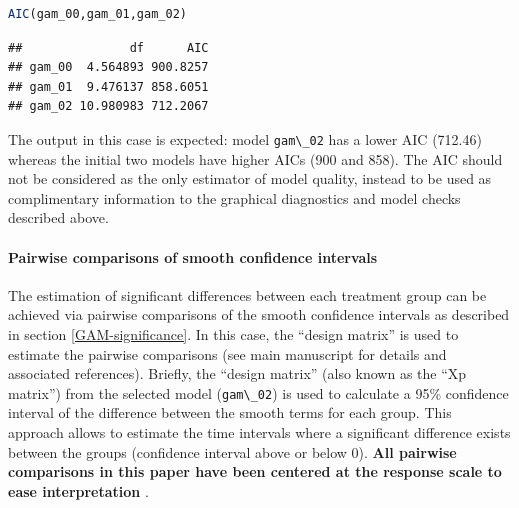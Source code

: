 \documentclass[
]{article}
\newcommand{\passthrough}[1]{#1}
\begin{document}
\begin{lstlisting}[language=R]
AIC(gam_00,gam_01,gam_02)
\end{lstlisting}

\begin{lstlisting}
##               df      AIC
## gam_00  4.564893 900.8257
## gam_01  9.476137 858.6051
## gam_02 10.980983 712.2067
\end{lstlisting}

The output in this case is expected: model \passthrough{\lstinline!gam\_02!} has a lower AIC (712.46) whereas the initial two models have higher AICs (900 and 858). The AIC should not be considered as the only estimator of model quality, instead to be used as complimentary information to the graphical diagnostics and model checks described above.

\hypertarget{pairwise-comparisons-of-smooth-confidence-intervals}{%
\paragraph{Pairwise comparisons of smooth confidence intervals}\label{pairwise-comparisons-of-smooth-confidence-intervals}}

The estimation of significant differences between each treatment group can be achieved via pairwise comparisons of the smooth confidence intervals as described in section \ref{GAM-significance}. In this case, the ``design matrix'' is used to estimate the pairwise comparisons (see main manuscript for details and associated references). Briefly, the ``design matrix'' (also known as the ``Xp matrix'') from the selected model (\passthrough{\lstinline!gam\_02!}) is used to calculate a 95\% confidence interval of the difference between the smooth terms for each group. This approach allows to estimate the time intervals where a significant difference exists between the groups (confidence interval above or below 0). \textbf{All pairwise comparisons in this paper have been centered at the response scale to ease interpretation }.
\end{document}
